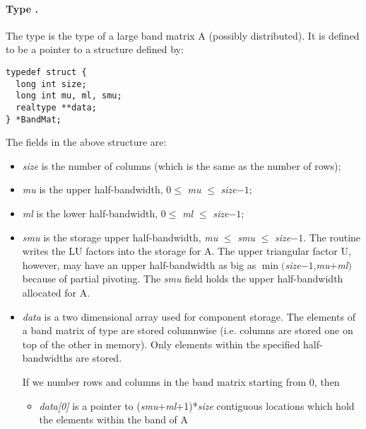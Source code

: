 %
\paragraph{Type .}
The type  is the type of a large band matrix A (possibly distributed). 
It is defined to be a pointer to a structure defined by:
\begin{verbatim}
typedef struct {
  long int size;
  long int mu, ml, smu;
  realtype **data;
} *BandMat;
\end{verbatim}
The fields in the above structure are:
\begin{itemize}

\item {\em size} is the number of columns (which is the same as the number of  rows);
                                                                  
\item {\em mu} is the upper half-bandwidth, $0 \le$ {\em mu} $\le$ {\em size}$-1$;

\item {\em ml} is the lower half-bandwidth, $0 \le$ {\em ml} $\le$ {\em size}$-1$;

\item {\em smu} is the storage upper half-bandwidth, 
  {\em mu} $\le$ {\em smu} $\le$ {\em size}$-1$.      
  The  routine writes the LU factors           
  into the storage for A. The upper triangular factor U, 
  however, may have an upper half-bandwidth as big as         
  $\min(${\em size}$-1$,{\em mu}$+${\em ml}$)$
  because of partial pivoting. The {\em smu} field holds the upper 
  half-bandwidth allocated for A.       
  
\item {\em data} is a two dimensional array used for component storage.    
  The elements of a band matrix of type  are      
  stored columnwise (i.e. columns are stored one on top  
  of the other in memory). Only elements within the      
  specified half-bandwidths are stored.                       
                                                                 
  If we number rows and columns in the band matrix starting      
  from $0$, then                                                   
  \begin{itemize}
  \item {\em data[0]} is a pointer to 
    ({\em smu}+{\em ml}+1)*{\em size} contiguous locations   
    which hold the elements within the band of A        
    

\end{itemize}
\end{itemize}
